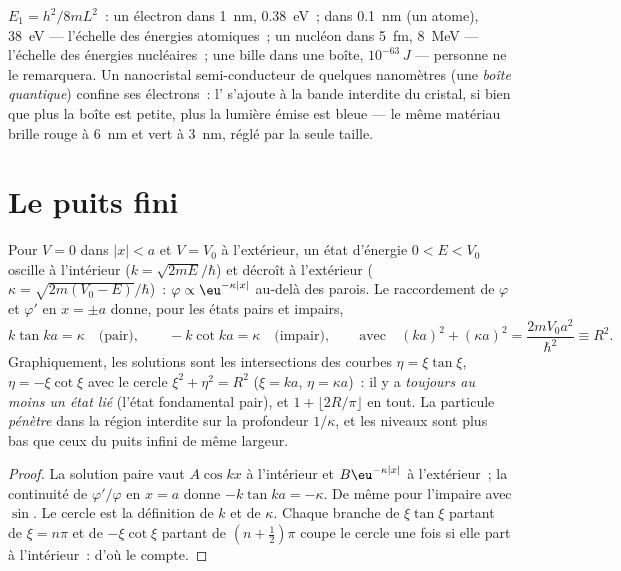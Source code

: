 \begin{example}\label{ex:b2:potential-wells-tunneling:orders}
$E_1 = h^2/8mL^2$~: un électron dans \qty{1}{nm}, \qty{0.38}{eV}~; dans
\qty{0.1}{nm} (un atome), \qty{38}{eV} --- l'échelle des énergies atomiques~; un
nucléon dans \qty{5}{fm}, \qty{8}{MeV} --- l'échelle des énergies nucléaires~; une
bille dans une boîte, $10^{-63}\,\unit{J}$ --- personne ne le remarquera. Un
nanocristal semi-conducteur de quelques nanomètres (une \emph{boîte
quantique}) confine ses électrons~: l' s'ajoute à la
bande interdite du cristal, si bien que plus la boîte est petite, plus la lumière émise est bleue ---
le même matériau brille rouge à \qty{6}{nm} et vert à \qty{3}{nm},
réglé par la seule taille.
\end{example}

\section{Le puits fini}

\begin{proposition}\label{prop:b2:potential-wells-tunneling:finite}
Pour $V = 0$ dans $|x| < a$ et $V = V_0$ à l'extérieur, un état d'énergie $0 < E < V_0$
oscille à l'intérieur ($k = \sqrt{2mE}/\hbar$) et décroît à l'extérieur ($\kappa =
\sqrt{2m(V_0 - E)}/\hbar$)~: $\varphi \propto \eu^{-\kappa|x|}$ au-delà des parois.
Le raccordement de $\varphi$ et $\varphi'$ en $x = \pm a$ donne, pour les états pairs et
impairs,
\[
k\tan ka = \kappa \quad\text{(pair)}, \qquad
-k\cot ka = \kappa \quad\text{(impair)}, \qquad\text{avec}\quad
(ka)^2 + (\kappa a)^2 = \frac{2mV_0a^2}{\hbar^2} \equiv R^2 .
\]
Graphiquement, les solutions sont les intersections des courbes $\eta =
\xi\tan\xi$, $\eta = -\xi\cot\xi$ avec le cercle $\xi^2 + \eta^2 = R^2$
($\xi = ka$, $\eta = \kappa a$)~: il y a \emph{toujours au moins un état
lié} (l'état fondamental pair), et $1 + \lfloor 2R/\pi\rfloor$ en tout.
La particule \emph{pénètre} dans la région interdite sur la profondeur
$1/\kappa$, et les niveaux sont plus bas que ceux du puits infini de
même largeur.
\end{proposition}

\begin{proof}
La solution paire vaut $A\cos kx$ à l'intérieur et $B\eu^{-\kappa|x|}$ à l'extérieur~; la
continuité de $\varphi'/\varphi$ en $x = a$ donne $-k\tan ka = -\kappa$. De même
pour l'impaire avec $\sin$. Le cercle est la définition de $k$ et de
$\kappa$. Chaque branche de $\xi\tan\xi$ partant de $\xi = n\pi$ et de
$-\xi\cot\xi$ partant de $(n + \tfrac12)\pi$ coupe le cercle une fois si elle
part à l'intérieur~: d'où le compte.
\end{proof}

